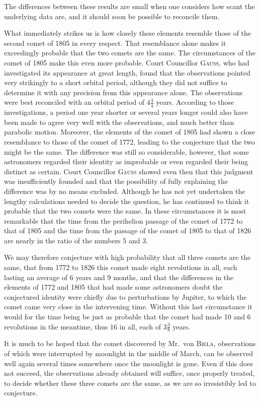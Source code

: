 The differences between these results are small when one considers how scant the underlying data are, and it should soon be possible to reconcile them.

What immediately strikes us is how closely these elements resemble those of the second comet of 1805 in every respect. That resemblance alone makes it exceedingly probable that the two comets are the same. The circumstances of the comet of 1805 make this even more probable. Court Councillor \textsc{Gauss}, who had investigated its appearance at great length, found that the observations pointed very strikingly to a short orbital period, although they did not suffice to determine it with any precision from this appearance alone. The observations were best reconciled with an orbital period of $4\frac{3}{4}$ years. According to those investigations, a period one year shorter or several years longer could also have been made to agree very well with the observations, and much better than parabolic motion. Moreover, the elements of the comet of 1805 had shown a close resemblance to those of the comet of 1772, leading to the conjecture that the two might be the same. The difference was still so considerable, however, that some astronomers regarded their identity as improbable or even regarded their being distinct as certain. Court Councillor \textsc{Gauss} showed even then that this judgment was insufficiently founded and that the possibility of fully explaining the difference was by no means excluded. Although he has not yet undertaken the lengthy calculations needed to decide the question, he has continued to think it probable that the two comets were the same. In these circumstances it is most remarkable that the time from the perihelion passage of the comet of 1772 to that of 1805 and the time from the passage of the comet of 1805 to that of 1826 are nearly in the ratio of the numbers 5 and 3.

We may therefore conjecture with high probability that all three comets are the same, that from 1772 to 1826 this comet made eight revolutions in all, each lasting an average of 6 years and 9 months, and that the differences in the elements of 1772 and 1805 that had made some astronomers doubt the conjectured identity were chiefly due to perturbations by Jupiter, to which the comet came very close in the intervening time. Without this last circumstance it would for the time being be just as probable that the comet had made 10 and 6 revolutions in the meantime, thus 16 in all, each of $3\frac{3}{8}$ years.

It is much to be hoped that the comet discovered by Mr.\ von \textsc{Biela}, observations of which were interrupted by moonlight in the middle of March, can be observed well again several times somewhere once the moonlight is gone. Even if this does not succeed, the observations already obtained will suffice, once properly treated, to decide whether these three comets are the same, as we are so irresistibly led to conjecture.